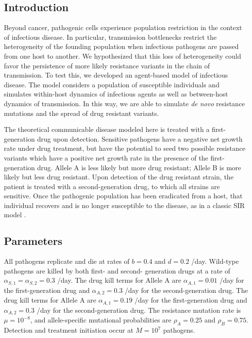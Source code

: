 \documentclass{article}
\begin{document}
\subsection{Introduction}

Beyond cancer, pathogenic cells experience population restriction in the context of infectious disease.  In particular, transmission bottlenecks restrict the heterogeneity of the founding population when infectious pathogens are passed from one host to another.  We hypothesized that this loss of heterogeneity could favor the persistence of more likely resistance variants in the chain of transmission.  To test this, we developed an agent-based model of infectious disease.  The model considers a population of susceptible individuals and simulates within-host dynamics of infectious agents as well as between-host dynamics of transmission.  In this way, we are able to simulate \textit{de novo} resistance mutations and the spread of drug resistant variants.  

The theoretical communicable disease modeled here is treated with a first-generation drug upon detection.  Sensitive pathogens have a negative net growth rate under drug treatment, but have the potential to seed two possible resistance variants which have a positive net growth rate in the presence of the first-generation drug.  Allele A is less likely but more drug resistant; Allele B is more likely but less drug resistant.  Upon detection of the drug resistant strain, the patient is treated with a second-generation drug, to which all strains are sensitive.  Once the pathogenic population has been eradicated from a host, that individual recovers and is no longer susceptible to the disease, as in a classic SIR model \cite{4}.

\subsection{Parameters}

All pathogens replicate and die at rates of $b = 0.4$ and $d = 0.2$ /day.  Wild-type pathogens are killed by both first- and second- generation drugs at a rate of $\alpha_{S,1} = \alpha_{S,2} = 0.3$ /day.  The drug kill terms for Allele A are $\alpha_{A,1} = 0.01$ /day for the first-generation drug and $\alpha_{A,2} = 0.3$ /day for the second-generation drug.  The drug kill terms for Allele A are $\alpha_{A,1} = 0.19$ /day for the first-generation drug and $\alpha_{A,2} = 0.3$ /day for the second-generation drug.  The resistance mutation rate is $\mu=10^{-8}$, and allele-specific mutational probabilities are $\rho_A=0.25$ and $\rho_B=0.75$.  Detection and treatment initiation occur at $M=10^7$ pathogens.
\end{document}
